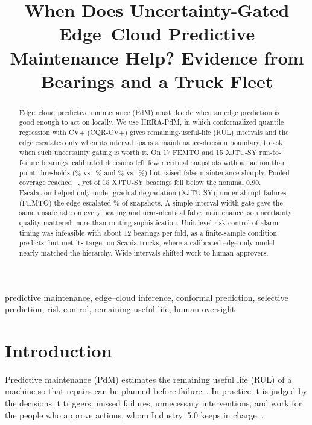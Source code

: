 \documentclass[conference]{IEEEtran}
\begin{document}
\title{When Does Uncertainty-Gated Edge--Cloud Predictive Maintenance Help? Evidence from Bearings and a Truck Fleet}

\author{
}

\maketitle

\begin{abstract}
Edge--cloud predictive maintenance (PdM) must decide when an edge prediction is good enough to act on locally. We use HERA-PdM, in which conformalized quantile regression with CV+ (CQR-CV+) gives remaining-useful-life (RUL) intervals and the edge escalates only when its interval spans a maintenance-decision boundary, to ask when such uncertainty gating is worth it. On 17 FEMTO and 15 XJTU-SY run-to-failure bearings, calibrated decisions left fewer critical snapshots without action than point thresholds (\feUnsafeHera\% vs.\ \feUnsafePoint\% and \xjUnsafeHera\% vs.\ \xjUnsafePoint\%) but raised false maintenance sharply. Pooled coverage reached \xjPicpCloud--\xjPicpEdge, yet \xjPbCovLow{} of 15 XJTU-SY bearings fell below the nominal 0.90. Escalation helped only under gradual degradation (XJTU-SY); under abrupt failures (FEMTO) the edge escalated \feEscHera\% of snapshots. A simple interval-width gate gave the same unsafe rate on every bearing and near-identical false maintenance, so uncertainty quality mattered more than routing sophistication. Unit-level risk control of alarm timing was infeasible with about 12 bearings per fold, as a finite-sample condition predicts, but met its target on \flN{} Scania trucks, where a calibrated edge-only model nearly matched the hierarchy. Wide intervals shifted work to human approvers.
\end{abstract}

\begin{IEEEkeywords}
predictive maintenance, edge--cloud inference, conformal prediction, selective prediction, risk control, remaining useful life, human oversight
\end{IEEEkeywords}

\section{Introduction}
Predictive maintenance (PdM) estimates the remaining useful life (RUL) of a machine so that repairs can be planned before failure~\cite{lei2018machinery}. In practice it is judged by the decisions it triggers: missed failures, unnecessary interventions, and work for the people who approve actions, whom Industry~5.0 keeps in charge~\cite{xu2021industry5,vanoudenhoven2023pdm5}.
\end{document}
